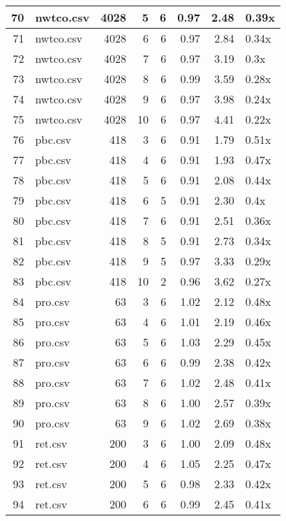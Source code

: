 \begin{table}[ht]
\begin{tabular}{rlrrrrrl}
   \hline
70 & nwtco.csv & 4028 &   5 &   6 & 0.97 & 2.48 & 0.39x \\ 
   \hline
71 & nwtco.csv & 4028 &   6 &   6 & 0.97 & 2.84 & 0.34x \\ 
   \hline
72 & nwtco.csv & 4028 &   7 &   6 & 0.97 & 3.19 & 0.3x \\ 
   \hline
73 & nwtco.csv & 4028 &   8 &   6 & 0.99 & 3.59 & 0.28x \\ 
   \hline
74 & nwtco.csv & 4028 &   9 &   6 & 0.97 & 3.98 & 0.24x \\ 
   \hline
75 & nwtco.csv & 4028 &  10 &   6 & 0.97 & 4.41 & 0.22x \\ 
   \hline
76 & pbc.csv & 418 &   3 &   6 & 0.91 & 1.79 & 0.51x \\ 
   \hline
77 & pbc.csv & 418 &   4 &   6 & 0.91 & 1.93 & 0.47x \\ 
   \hline
78 & pbc.csv & 418 &   5 &   6 & 0.91 & 2.08 & 0.44x \\ 
   \hline
79 & pbc.csv & 418 &   6 &   5 & 0.91 & 2.30 & 0.4x \\ 
   \hline
80 & pbc.csv & 418 &   7 &   6 & 0.91 & 2.51 & 0.36x \\ 
   \hline
81 & pbc.csv & 418 &   8 &   5 & 0.91 & 2.73 & 0.34x \\ 
   \hline
82 & pbc.csv & 418 &   9 &   5 & 0.97 & 3.33 & 0.29x \\ 
   \hline
83 & pbc.csv & 418 &  10 &   2 & 0.96 & 3.62 & 0.27x \\ 
   \hline
84 & pro.csv &  63 &   3 &   6 & 1.02 & 2.12 & 0.48x \\ 
   \hline
85 & pro.csv &  63 &   4 &   6 & 1.01 & 2.19 & 0.46x \\ 
   \hline
86 & pro.csv &  63 &   5 &   6 & 1.03 & 2.29 & 0.45x \\ 
   \hline
87 & pro.csv &  63 &   6 &   6 & 0.99 & 2.38 & 0.42x \\ 
   \hline
88 & pro.csv &  63 &   7 &   6 & 1.02 & 2.48 & 0.41x \\ 
   \hline
89 & pro.csv &  63 &   8 &   6 & 1.00 & 2.57 & 0.39x \\ 
   \hline
90 & pro.csv &  63 &   9 &   6 & 1.02 & 2.69 & 0.38x \\ 
   \hline
91 & ret.csv & 200 &   3 &   6 & 1.00 & 2.09 & 0.48x \\ 
   \hline
92 & ret.csv & 200 &   4 &   6 & 1.05 & 2.25 & 0.47x \\ 
   \hline
93 & ret.csv & 200 &   5 &   6 & 0.98 & 2.33 & 0.42x \\ 
   \hline
94 & ret.csv & 200 &   6 &   6 & 0.99 & 2.45 & 0.41x \\ 

\end{tabular}
\end{table}
